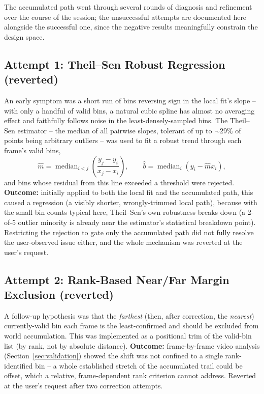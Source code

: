 \documentclass[11pt]{article}
\begin{document}
The accumulated path went through several rounds of diagnosis and refinement over the course of
the session; the unsuccessful attempts are documented here alongside the successful one, since the
negative results meaningfully constrain the design space.

\subsection{Attempt 1: Theil--Sen Robust Regression (reverted)}
An early symptom was a short run of bins reversing sign in the local fit's slope -- with only a
handful of valid bins, a natural cubic spline has almost no averaging effect and faithfully follows
noise in the least-densely-sampled bins. The Theil--Sen estimator
\citep{theil1950,sen1968} -- the median of all pairwise slopes, tolerant of up to $\sim$29\% of
points being arbitrary outliers -- was used to fit a robust trend through each frame's valid bins,
\begin{equation}
\hat{m} = \operatorname{median}_{i<j} \left( \frac{y_j - y_i}{x_j - x_i} \right), \qquad
\hat{b} = \operatorname{median}_i \left( y_i - \hat{m} x_i \right),
\label{eq:theilsen}
\end{equation}
and bins whose residual from this line exceeded a threshold were rejected. \textbf{Outcome:}
initially applied to both the local fit and the accumulated path, this caused a regression (a
visibly shorter, wrongly-trimmed local path), because with the small bin counts typical here,
Theil--Sen's own robustness breaks down (a 2-of-5 outlier minority is already near the estimator's
statistical breakdown point). Restricting the rejection to gate only the accumulated path did not
fully resolve the user-observed issue either, and the whole mechanism was reverted at the user's
request.

\subsection{Attempt 2: Rank-Based Near/Far Margin Exclusion (reverted)}
A follow-up hypothesis was that the \emph{farthest} (then, after correction, the \emph{nearest})
currently-valid bin each frame is the least-confirmed and should be excluded from world
accumulation. This was implemented as a positional trim of the valid-bin list (by rank, not by
absolute distance). \textbf{Outcome:} frame-by-frame video analysis (Section~\ref{sec:validation})
showed the shift was not confined to a single rank-identified bin -- a whole established stretch of
the accumulated trail could be offset, which a relative, frame-dependent rank criterion cannot
address. Reverted at the user's request after two correction attempts.
\end{document}
